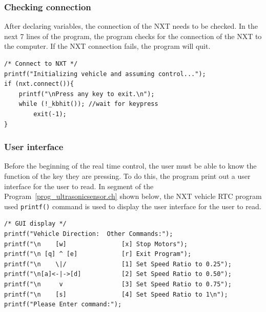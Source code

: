 \documentclass[11pt]{article}
\begin{document}
\subsubsection*{Checking connection}
After declaring variables, the connection of the NXT needs to be checked. In the 
next 7 lines of the program, the program checks for the connection of the NXT to 
the computer. If the NXT connection fails, the program will quit.
\begin{lstlisting}
/* Connect to NXT */
printf("Initializing vehicle and assuming control...");
if (nxt.connect()){
    printf("\nPress any key to exit.\n");
    while (!_kbhit()); //wait for keypress
        exit(-1);
}
\end{lstlisting}

\subsubsection*{User interface}
Before the beginning of the real time control, the user must be able to know the 
function of the key they are pressing. To do this, the program print out a user 
interface for the user to read. In segment of the Program~\ref{prog_ultrasonicsensor.ch} 
shown below, the NXT vehicle RTC program used {\tt printf()} command is used to 
display the user interface for the user to read.
\begin{lstlisting}
/* GUI display */
printf("Vehicle Direction:  Other Commands:");
printf("\n    [w]               [x] Stop Motors");
printf("\n [q] ^ [e]            [r] Exit Program");
printf("\n    \|/               [1] Set Speed Ratio to 0.25");
printf("\n[a]<-|->[d]           [2] Set Speed Ratio to 0.50");
printf("\n     v                [3] Set Speed Ratio to 0.75");
printf("\n    [s]               [4] Set Speed Ratio to 1\n");
printf("Please Enter command:");
\end{lstlisting}
\end{document}
